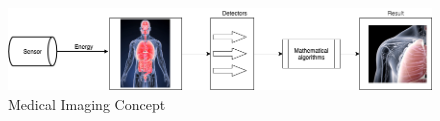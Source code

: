 \begin{figure}
    \centerline{\includegraphics[width=1\columnwidth]{02-related-works/figures/medical-imaging-system-concept.png}}
    \caption{Medical Imaging Concept}
    \label{fig:medical-imaging-system-concept}
\end{figure}